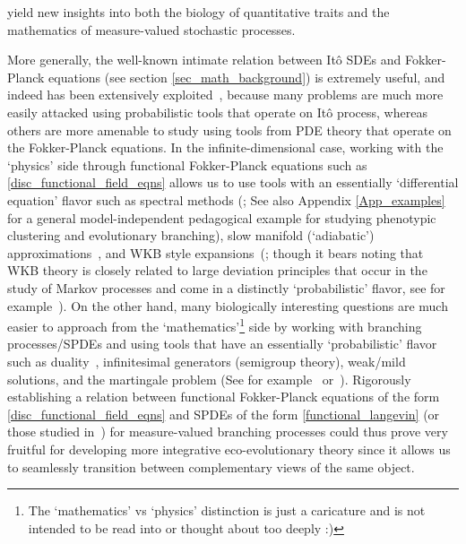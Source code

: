 yield new insights into both the biology of quantitative traits and the mathematics of measure-valued stochastic processes.

More generally, the well-known intimate relation between It\^o SDEs and Fokker-Planck equations (see section \ref{sec_math_background}) is extremely useful, and indeed has been extensively exploited~\citep{van_kampen_stochastic_1981,oksendal_stochastic_1998, gardiner_stochastic_2009}, because many problems are much more easily attacked using probabilistic tools that operate on It\^o process, whereas others are more amenable to study using tools from PDE theory that operate on the Fokker-Planck equations. In the infinite-dimensional case, working with the `physics' side through functional Fokker-Planck equations such as \eqref{disc_functional_field_eqns} allows us to use tools with an essentially `differential equation' flavor such as spectral methods (\cite{rogers_demographic_2012, rogers_modes_2015}; See also Appendix \ref{App_examples} for a general model-independent pedagogical example for studying phenotypic clustering and evolutionary branching), slow manifold (`adiabatic') approximations~\citep{parsons_dimension_2017}, and WKB style expansions~(\cite{rogers_demographic_2012,assaf_wkb_2017}; though it bears noting that WKB theory is closely related to large deviation principles that occur in the study of Markov processes and come in a distinctly `probabilistic' flavor, see for example~\cite{dembo_large_1998}). On the other hand, many biologically interesting questions are much easier to approach from the `mathematics'\footnote{The `mathematics' vs `physics' distinction is just a caricature and is not intended to be read into or thought about too deeply :)} side by working with branching processes/SPDEs and using tools that have an essentially `probabilistic' flavor such as duality~\citep{dawson_stochastic_1975,greenman_duality_2020}, infinitesimal generators (semigroup theory), weak/mild solutions, and the martingale problem (See for example~\cite{etheridge_mathematical_2011} or~\cite{week_white_2021}). Rigorously establishing a relation between functional Fokker-Planck equations of the form \eqref{disc_functional_field_eqns} and SPDEs of the form \eqref{functional_langevin} (or those studied in~\cite{week_white_2021}) for measure-valued branching processes could thus prove very fruitful for developing more integrative eco-evolutionary theory since it allows us to seamlessly transition between complementary views of the same object.

